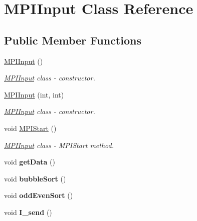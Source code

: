 \hypertarget{classMPIInput}{}\section{M\+P\+I\+Input Class Reference}
\label{classMPIInput}
\subsection*{Public Member Functions}
\begin{DoxyCompactItemize}
\item 
\hyperlink{classMPIInput_a1fd40b314f5e63f0948050dd687f2d6d}{M\+P\+I\+Input} ()
\begin{DoxyCompactList}\small\item\em \hyperlink{classMPIInput}{M\+P\+I\+Input} class -\/ constructor. \end{DoxyCompactList}\item 
\hyperlink{classMPIInput_aad9097968754daede74b4e9931f58c8a}{M\+P\+I\+Input} (int, int)
\begin{DoxyCompactList}\small\item\em \hyperlink{classMPIInput}{M\+P\+I\+Input} class -\/ constructor. \end{DoxyCompactList}\item 
void \hyperlink{classMPIInput_a5204b6d3bea6d1d6110b6d180da43e07}{M\+P\+I\+Start} ()
\begin{DoxyCompactList}\small\item\em \hyperlink{classMPIInput}{M\+P\+I\+Input} class -\/ M\+P\+I\+Start method. \end{DoxyCompactList}\item 
\mbox{\label{classMPIInput_ab573f01916c4e35072009b95602a1399}} 
void {\bfseries get\+Data} ()
\item 
\mbox{\label{classMPIInput_a03c8faee4d48167f2ab33b52fad7e5ea}} 
void {\bfseries bubble\+Sort} ()
\item 
\mbox{\label{classMPIInput_a1c6165f90d30a3988eba3b9cea5afefa}} 
void {\bfseries odd\+Even\+Sort} ()
\item 
\mbox{\label{classMPIInput_ab90ddedf8faad1bfeb850d6303af50a5}} 
void {\bfseries I\+\_\+send} ()
\end{DoxyCompactItemize}


